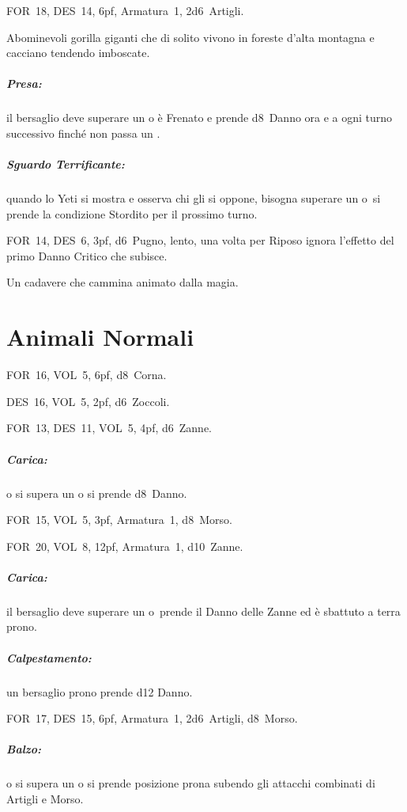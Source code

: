 \documentclass[itdr]{subfiles}
\begin{document}
\vfill

FOR~18, DES~14, 6pf, Armatura~1, 2d6~Artigli.

Abominevoli gorilla giganti che di solito vivono in foreste d'alta montagna e cacciano tendendo imboscate.

\subparagraph{Presa:} il bersaglio deve superare un  o è Frenato e prende d8~Danno ora e a ogni turno successivo finché non passa un .

\subparagraph{Sguardo Terrificante:} quando lo Yeti si mostra e osserva chi gli si oppone, bisogna superare un  o~si prende la condizione Stordito per il prossimo turno.

\vfill

FOR~14, DES~6, 3pf, d6~Pugno, lento, una volta per Riposo \mbox{ignora} l'effetto del primo Danno Critico che subisce.

Un cadavere che cammina animato dalla magia.

\vspace{15ex}
\break

\section{Animali Normali}

FOR~16, VOL~5, 6pf, d8~Corna.

\vspace{2ex}

DES~16, VOL~5, 2pf, d6~Zoccoli.

\vspace{2ex}

FOR~13, DES~11, VOL~5, 4pf, d6~Zanne.
\subparagraph{Carica:} o si supera un  o si prende d8~Danno.

\vspace{2ex}

FOR~15, VOL~5, 3pf, Armatura~1, d8~Morso.

\vspace{2ex}

FOR~20, VOL~8, 12pf, Armatura~1, d10~Zanne.
\subparagraph{Carica:} il bersaglio deve superare un  o~prende il Danno delle Zanne ed è sbattuto a terra prono.
\subparagraph{Calpestamento:} un bersaglio prono prende d12 Danno.

\vspace{2ex}

FOR~17, DES~15, 6pf, Armatura~1, 2d6~Artigli, d8~Morso.
\subparagraph{Balzo:} o si supera un  o si prende posizione prona subendo gli attacchi combinati di Artigli e Morso.
\end{document}
